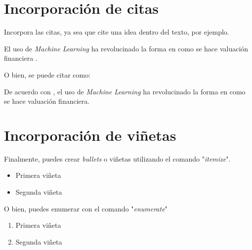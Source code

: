 \setlength{\parskip}{1em}

\section{Incorporación de citas}

Incorpora las citas, ya sea que cite una idea dentro del texto, por ejemplo.

El uso de \textit{Machine Learning} ha revolucinado la forma en como se hace valuación financiera \parencite{Moat}.

O bien, se puede citar como:

De acuerdo con \textcite{Moat}, el uso de \textit{Machine Learning} ha revolucinado la forma en como se hace valuación financiera.

\section{Incorporación de viñetas}

Finalmente, puedes crear \textit{bullets} o viñetas utilizando el comando "\textit{itemize}".

\begin{itemize}
    \item Primera viñeta
    \item Segunda viñeta
\end{itemize}

O bien, puedes enumerar con el comando "\textit{enumerate}"

\begin{enumerate}
    \item Primera viñeta
    \item Segunda viñeta
\end{enumerate}
